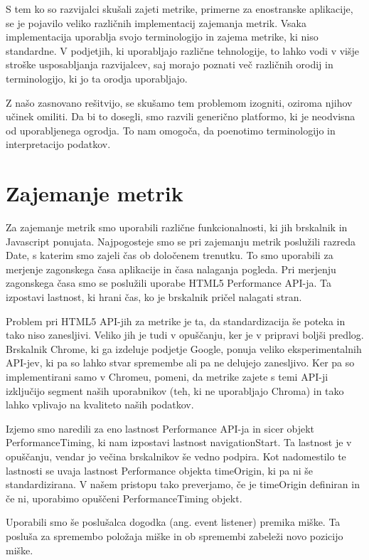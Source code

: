 \documentclass[a4paper, 12pt]{book}
\begin{document}
S tem ko so razvijalci skušali zajeti metrike, primerne za enostranske aplikacije, se je pojavilo veliko različnih implementacij zajemanja metrik. Vsaka implementacija uporablja svojo terminologijo in zajema metrike, ki niso standardne. V podjetjih, ki uporabljajo različne tehnologije, to lahko vodi v višje stroške usposabljanja razvijalcev, saj morajo poznati več različnih orodij in terminologijo, ki jo ta orodja uporabljajo.

Z našo zasnovano rešitvijo, se skušamo tem problemom izogniti, oziroma njihov učinek omiliti. Da bi to dosegli, smo razvili generično platformo, ki je neodvisna od uporabljenega ogrodja. To nam omogoča, da poenotimo terminologijo in interpretacijo podatkov.

\section{Zajemanje metrik}

Za zajemanje metrik smo uporabili različne funkcionalnosti, ki jih brskalnik in Javascript ponujata. Najpogosteje smo se pri zajemanju metrik poslužili razreda Date, s katerim smo zajeli čas ob določenem trenutku. To smo uporabili za merjenje zagonskega časa aplikacije in časa nalaganja pogleda. Pri merjenju zagonskega časa smo se poslužili uporabe HTML5 Performance API-ja. Ta izpostavi lastnost, ki hrani čas, ko je brskalnik pričel nalagati stran.

Problem pri HTML5 API-jih za metrike je ta, da standardizacija še poteka in tako niso zanesljivi. Veliko jih je tudi v opuščanju, ker je v pripravi boljši predlog. Brskalnik Chrome, ki ga izdeluje podjetje Google, ponuja veliko eksperimentalnih API-jev, ki pa so lahko stvar spremembe ali pa ne delujejo zanesljivo. Ker pa so implementirani samo v Chromeu, pomeni, da metrike zajete s temi API-ji izključijo segment naših uporabnikov (teh, ki ne uporabljajo Chroma) in tako lahko vplivajo na kvaliteto naših podatkov.

Izjemo smo naredili za eno lastnost Performance API-ja in sicer objekt PerformanceTiming, ki nam izpostavi lastnost navigationStart. Ta lastnost je v opuščanju, vendar jo večina brskalnikov še vedno podpira. Kot nadomestilo te lastnosti se uvaja lastnost Performance objekta timeOrigin, ki pa ni še standardizirana. V našem pristopu tako preverjamo, če je timeOrigin definiran in če ni, uporabimo opuščeni PerformanceTiming objekt.

Uporabili smo še poslušalca dogodka (ang. event listener) premika miške. Ta posluša za spremembo položaja miške in ob spremembi zabeleži novo pozicijo miške.
\end{document}
